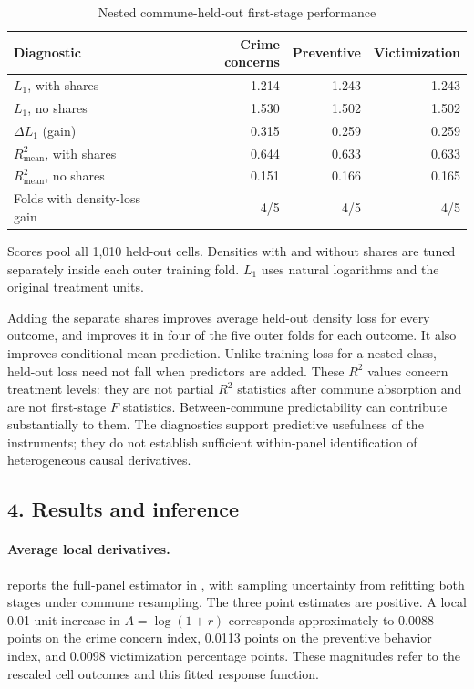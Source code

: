 \documentclass{article}
\begin{document}
\begin{table}[H]
\centering
\caption{Nested commune-held-out first-stage performance}
\label{tab:neural-first-stage}
\small
\begin{tabularx}{\linewidth}{@{}Xrrr@{}}
\toprule
Diagnostic & Crime concerns & Preventive & Victimization\\
\midrule
$L_1$, with shares & 1.214 & 1.243 & 1.243\\
$L_1$, no shares & 1.530 & 1.502 & 1.502\\
$\Delta L_1$ (gain) & 0.315 & 0.259 & 0.259\\
$R^2_{\mathrm{mean}}$, with shares & 0.644 & 0.633 & 0.633\\
$R^2_{\mathrm{mean}}$, no shares & 0.151 & 0.166 & 0.165\\
Folds with density-loss gain & 4/5 & 4/5 & 4/5\\
\bottomrule
\end{tabularx}
\smallskip
\parbox{\linewidth}{\footnotesize Scores pool all 1,010 held-out cells. Densities with and without shares are tuned separately inside each outer training fold. $L_1$ uses natural logarithms and the original treatment units.}
\end{table}

Adding the separate shares improves average held-out density loss for every outcome, and improves it in four of the five outer folds for each outcome. It also improves conditional-mean prediction. Unlike training loss for a nested class, held-out loss need not fall when predictors are added. These $R^2$ values concern treatment levels: they are not partial $R^2$ statistics after commune absorption and are not first-stage $F$ statistics. Between-commune predictability can contribute substantially to them. The diagnostics support predictive usefulness of the instruments; they do not establish sufficient within-panel identification of heterogeneous causal derivatives.

\subsection*{4. Results and inference}
\paragraph{Average local derivatives.}
 reports the full-panel estimator in , with sampling uncertainty from refitting both stages under commune resampling. The three point estimates are positive. A local 0.01-unit increase in $A=\log(1+r)$ corresponds approximately to 0.0088 points on the crime concern index, 0.0113 points on the preventive behavior index, and 0.0098 victimization percentage points. These magnitudes refer to the rescaled cell outcomes and this fitted response function.
\end{document}
